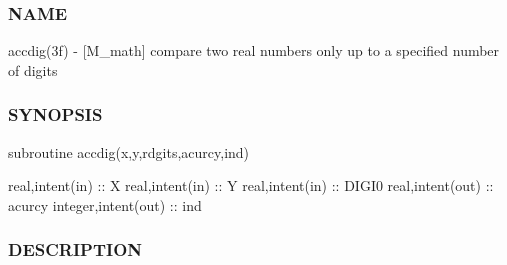 \subsubsection*{N\+A\+ME}

accdig(3f) -\/ \mbox{[}M\+\_\+math\mbox{]} compare two real numbers only up to a specified number of digits 

\subsubsection*{S\+Y\+N\+O\+P\+S\+IS}

\begin{DoxyVerb}   subroutine accdig(x,y,rdgits,acurcy,ind)

    real,intent(in)     :: X
    real,intent(in)     :: Y
    real,intent(in)     :: DIGI0
    real,intent(out)    :: acurcy
    integer,intent(out) :: ind
\end{DoxyVerb}


\subsubsection*{D\+E\+S\+C\+R\+I\+P\+T\+I\+ON}

